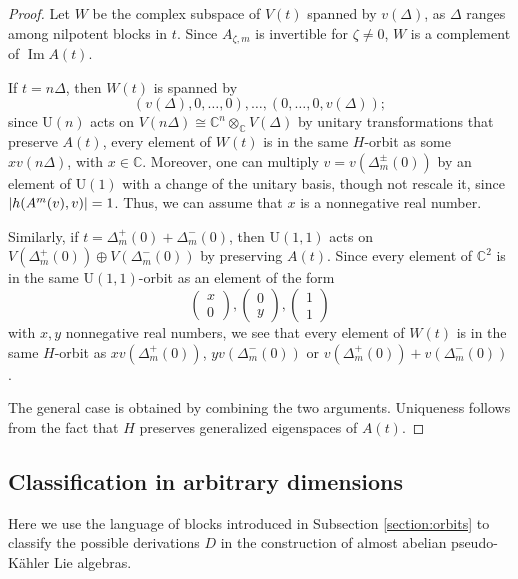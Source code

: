 \documentclass{article}
\theoremstyle{definition}
\newcommand{\C}{\mathbb{C}}
\renewcommand{\Im}{\operatorname{Im}}
\DeclarePairedDelimiter{\abs}{\lvert}{\rvert}
\begin{document}
\begin{proof}
    Let $W$ be the complex subspace of $V(t)$ spanned by $v(\Delta)$, as $\Delta$ ranges among nilpotent blocks in $t$. Since $A_{\zeta,m}$ is invertible for $\zeta\neq0$, $W$ is a complement of $\Im A(t)$.\medskip

    If $t=n\Delta$, then $W(t)$ is spanned by $$(v(\Delta),0,\dotsc, 0),\dotsc, (0,\dotsc, 0,v(\Delta));$$ since  $\mathrm{U}(n)$ acts on $V(n\Delta)\cong\C^n\otimes_\C V(\Delta)$ by unitary transformations that preserve $A(t)$, every element of $W(t)$ is in the same $H$-orbit as some $xv(n\Delta)$, with $x\in\C$. Moreover, one can multiply $v=v(\Delta^\pm_m(0))$ by an element of $\mathrm{U}(1)$ with a change of the unitary basis, though not rescale it, since $\abs{h(A^{m}(v),v)}=1$. Thus, we can assume that $x$ is a nonnegative real number.\medskip

    Similarly, if $t=\Delta^+_m(0)+\Delta^-_m(0)$, then $\mathrm{U}(1,1)$ acts on $V(\Delta^+_m(0))\oplus V(\Delta^-_m(0))$ by preserving $A(t)$. Since every element of $\C^2$ is in the same $\mathrm{U}(1,1)$-orbit as an element of the form $$\begin{pmatrix} x \\ 0 \end{pmatrix}, \begin{pmatrix} 0 \\ y \end{pmatrix}, \begin{pmatrix} 1\\ 1 \end{pmatrix}$$ with $x,y$ nonnegative real numbers, we see that every element of $W(t)$ is in the same $H$-orbit as $xv(\Delta^+_m(0))$, $yv(\Delta^-_m(0))$ or $v(\Delta^+_m(0))+v(\Delta^-_m(0))$.\medskip

    The general case is obtained by combining the two arguments. Uniqueness follows from the fact that $H$ preserves generalized eigenspaces of $A(t)$.
\end{proof}

\subsection{Classification in arbitrary dimensions}\label{section:classification_every_dim}

Here we use the language of blocks introduced in Subsection \ref{section:orbits} to classify the possible derivations $D$ in the construction of almost abelian pseudo-Kähler Lie algebras.\medskip
\end{document}
